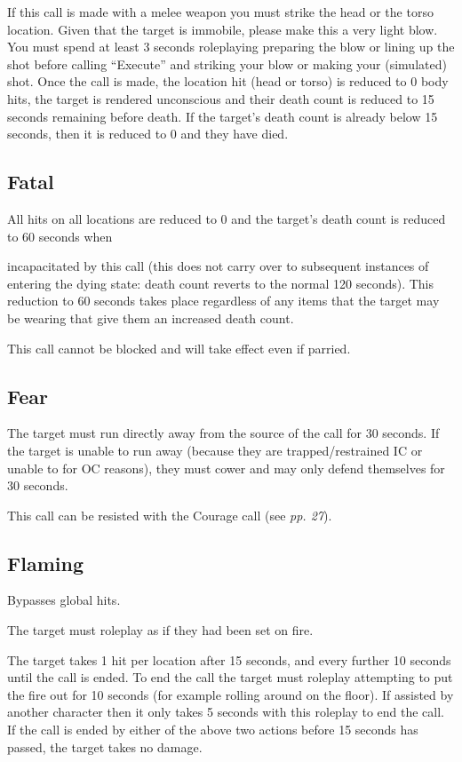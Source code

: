 If this call is made with a melee weapon you must strike the head or the torso location. Given that the target is immobile, please make this a very light blow. You must spend at least 3 seconds roleplaying preparing the blow or lining up the shot before calling ``Execute'' and striking your blow or making your (simulated) shot. Once the call is made, the location hit (head or torso) is reduced to 0 body hits, the target is rendered unconscious and their death count is reduced to 15 seconds remaining before death. If the target's death count is already below 15 seconds, then it is reduced to 0 and they have died.

\subsection{Fatal}

All hits on all locations are reduced to 0 and the target's death count is reduced to 60 seconds when

incapacitated by this call (this does not carry over to subsequent instances of entering the dying state: death count reverts to the normal 120 seconds). This reduction to 60 seconds takes place regardless of any items that the target may be wearing that give them an increased death count.

This call cannot be blocked and will take effect even if parried.

\subsection{Fear}

The target must run directly away from the source of the call for 30 seconds. If the target is unable to run away (because they are trapped/restrained IC or unable to for OC reasons), they must cower and may only defend themselves for 30 seconds.

This call can be resisted with the Courage call (see \textit{pp. 27}).

\subsection{Flaming}

Bypasses global hits.

The target must roleplay as if they had been set on fire.

The target takes 1 hit per location after 15 seconds, and every further 10 seconds until the call is ended. To end the call the target must roleplay attempting to put the fire out for 10 seconds (for example rolling around on the floor). If assisted by another character then it only takes 5 seconds with this roleplay to end the call. If the call is ended by either of the above two actions before 15 seconds has passed, the target takes no damage.


